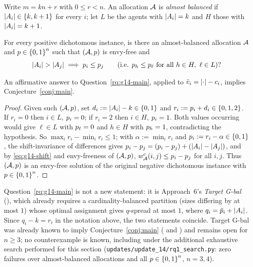 Write $m = kn + r$ with $0 \le r < n$. An allocation $\mathcal{A}$ is
\emph{almost balanced} if $\left\lvert A_{i}\right\rvert \in \left\{k,k+1\right\}$ for every $i$;
let $L$ be the agents with $\left\lvert A_{i}\right\rvert=k$ and $H$ those with
$\left\lvert A_{i}\right\rvert=k+1$.

\begin{definition}
\label{rq:g14-main}
For every positive dichotomous instance, is there an almost-balanced
allocation $\mathcal{A}$ and $p \in \left\{0,1\right\}^n$ such that $(\mathcal{A},p)$
is envy-free and
\[
  \left\lvert A_{i}\right\rvert > \left\lvert A_{j}\right\rvert \implies p_i \le p_j
  \qquad \text{(i.e. } p_h \le p_\ell \text{ for all } h \in H,\ \ell \in L \text{)?}
\]
\end{definition}

\begin{proposition}
\label{prop:g14-reduction}
An affirmative answer to Question~\ref{rq:g14-main}, applied to
$\tilde v_i = \left\lvert\cdot\right\rvert - c_i$, implies Conjecture~\ref{conj:main}.
\end{proposition}
\begin{proof}
Given such $(\mathcal{A},p)$, set $d_i := \left\lvert A_{i}\right\rvert-k \in \left\{0,1\right\}$
and $r_i := p_i + d_i \in \left\{0,1,2\right\}$. If $r_i=0$ then $i\in L$,
$p_i=0$; if $r_i=2$ then $i\in H$, $p_i=1$. Both values
occurring would give $\ell\in L$ with $p_\ell=0$ and $h\in H$ with
$p_h=1$, contradicting the hypothesis. So
$\max_i r_i - \min_i r_i \le 1$; with $\alpha:=\min_i r_i$ and
$p_i := r_i-\alpha \in \left\{0,1\right\}$, the shift-invariance of differences gives
$p_i-p_j = (p_i-p_j)+(\left\lvert A_{i}\right\rvert-\left\lvert A_{j}\right\rvert)$, and by
\eqref{eq:g14-shift} and envy-freeness of $(\mathcal{A},p)$,
$w^{c}_{\mathcal{A}}(i,j) \le p_i-p_j$ for all $i,j$. Thus $(\mathcal{A},p)$ is an
envy-free solution of the original negative dichotomous instance with
$p\in\left\{0,1\right\}^n$.
\end{proof}

\begin{remark}
\label{rem:g14-notnew}
Question~\ref{rq:g14-main} is not a new statement: it is Approach~6's
\emph{Target G-bal} (), which already requires a
cardinality-balanced partition (sizes differing by at most $1$) whose
optimal assignment gives $q$-spread at most $1$, where
$q_i = \tilde{p}_i + \left\lvert A_{i}\right\rvert$. Since $q_i - k = r_i$ in the
notation above, the two statements coincide. Target G-bal was already known
to imply Conjecture~\ref{conj:main} ( and
) and remains open for $n \ge 3$; no
counterexample is known, including under the additional exhaustive search
performed for this section (\texttt{updates/update\_14/rq1\_search.py}: zero
failures over almost-balanced allocations and all
$p\in\left\{0,1\right\}^n$, $n=3,4$).
\end{remark}

